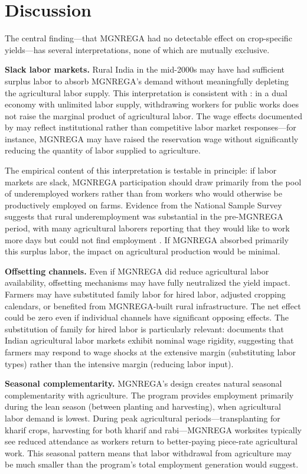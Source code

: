 \documentclass[12pt]{article}
\begin{document}
\section{Discussion}

The central finding---that MGNREGA had no detectable effect on crop-specific yields---has several interpretations, none of which are mutually exclusive.

\textbf{Slack labor markets.} Rural India in the mid-2000s may have had sufficient surplus labor to absorb MGNREGA's demand without meaningfully depleting the agricultural labor supply. This interpretation is consistent with \citet{lewis1954economic}: in a dual economy with unlimited labor supply, withdrawing workers for public works does not raise the marginal product of agricultural labor. The wage effects documented by \citet{imbert2015labor} may reflect institutional rather than competitive labor market responses---for instance, MGNREGA may have raised the reservation wage without significantly reducing the quantity of labor supplied to agriculture.

The empirical content of this interpretation is testable in principle: if labor markets are slack, MGNREGA participation should draw primarily from the pool of underemployed workers rather than from workers who would otherwise be productively employed on farms. Evidence from the National Sample Survey suggests that rural underemployment was substantial in the pre-MGNREGA period, with many agricultural laborers reporting that they would like to work more days but could not find employment \citep{desai2015india}. If MGNREGA absorbed primarily this surplus labor, the impact on agricultural production would be minimal.

\textbf{Offsetting channels.} Even if MGNREGA did reduce agricultural labor availability, offsetting mechanisms may have fully neutralized the yield impact. Farmers may have substituted family labor for hired labor, adjusted cropping calendars, or benefited from MGNREGA-built rural infrastructure. The net effect could be zero even if individual channels have significant opposing effects. The substitution of family for hired labor is particularly relevant: \citet{kaur2019nominal} documents that Indian agricultural labor markets exhibit nominal wage rigidity, suggesting that farmers may respond to wage shocks at the extensive margin (substituting labor types) rather than the intensive margin (reducing labor input).

\textbf{Seasonal complementarity.} MGNREGA's design creates natural seasonal complementarity with agriculture. The program provides employment primarily during the lean season (between planting and harvesting), when agricultural labor demand is lowest. During peak agricultural periods---transplanting for kharif crops, harvesting for both kharif and rabi---MGNREGA worksites typically see reduced attendance as workers return to better-paying piece-rate agricultural work. This seasonal pattern means that labor withdrawal from agriculture may be much smaller than the program's total employment generation would suggest.
\end{document}
